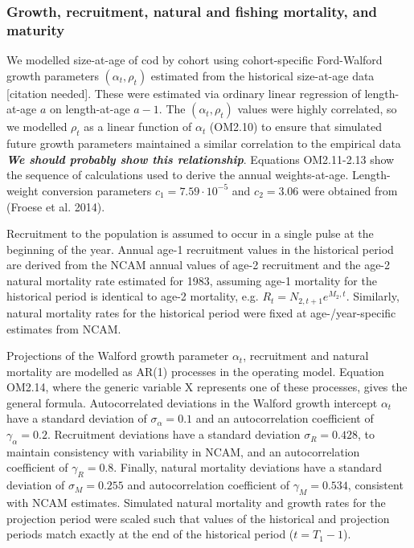 \documentclass[12pt,]{article}
\begin{document}
\subsubsection{Growth, recruitment, natural and fishing mortality, and
maturity}\label{growth-recruitment-natural-and-fishing-mortality-and-maturity}

We modelled size-at-age of cod by cohort using cohort-specific
Ford-Walford growth parameters \((\alpha_t,\rho_t)\) estimated from the
historical size-at-age data {[}citation needed{]}. These were estimated
via ordinary linear regression of length-at-age \(a\) on length-at-age
\(a-1\). The \((\alpha_t,\rho_t)\) values were highly correlated, so we
modelled \(\rho_t\) as a linear function of \(\alpha_t\) (OM2.10) to
ensure that simulated future growth parameters maintained a similar
correlation to the empirical data \textbf{\emph{We should probably show
this relationship}}. Equations OM2.11-2.13 show the sequence of
calculations used to derive the annual weights-at-age. Length-weight
conversion parameters \(c_1 = 7.59 \cdot 10^{-5}\) and \(c_2 = 3.06\)
were obtained from (Froese et al. 2014).

Recruitment to the population is assumed to occur in a single pulse at
the beginning of the year. Annual age-1 recruitment values in the
historical period are derived from the NCAM annual values of age-2
recruitment and the age-2 natural mortality rate estimated for 1983,
assuming age-1 mortality for the historical period is identical to age-2
mortality, e.g. \(R_t = N_{2,t+1} e^{M_2,t}\). Similarly, natural
mortality rates for the historical period were fixed at
age-/year-specific estimates from NCAM.

Projections of the Walford growth parameter \(\alpha_t\), recruitment
and natural mortality are modelled as AR(1) processes in the operating
model. Equation OM2.14, where the generic variable X represents one of
these processes, gives the general formula. Autocorrelated deviations in
the Walford growth intercept \(\alpha_t\) have a standard deviation of
\(\sigma_\alpha=0.1\) and an autocorrelation coefficient of
\(\gamma_\alpha=0.2\). Recruitment deviations have a standard deviation
\(\sigma_R = 0.428\), to maintain consistency with variability in NCAM,
and an autocorrelation coefficient of \(\gamma_R=0.8\). Finally, natural
mortality deviations have a standard deviation of \(\sigma_M = 0.255\)
and autocorrelation coefficient of \(\gamma_M=0.534\), consistent with
NCAM estimates. Simulated natural mortality and growth rates for the
projection period were scaled such that values of the historical and
projection periods match exactly at the end of the historical period
(\(t = T_1-1\)).
\end{document}
